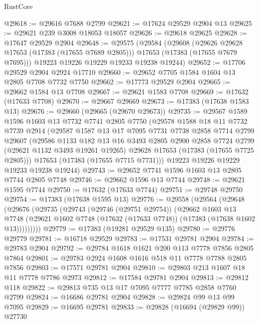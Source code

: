 \begin{lexlean}{RustCore}
\begin{coremodule}
@29618 := @29616 @7688 @2799
@29621 := @17624 @29529 @2904 @13
@29625 := @29621 @239 @3008 @18053 @18057
@29626 := @29618 @29625
@29628 := @17647 @29529 @2904
@29648 := @29575
    (@29584
      (@29608
        (@29626 @29628 @17653 (@17383 (@17655 @7689 @2805)))
        @17653
        (@17383 (@17655 @7679 @7695)))
      @19223
      @19226
      @19229
      @19233
      @19238
      @19244)
@29652 := @17706 @29529 @2904 @2924 @17710
@29660 := @29652 @7705 @1584 @1604 @13 @2805 @7708 @7732 @7750
@29662 := @17773 @29529 @2904
@29665 := @29662 @1584 @13 @7708
@29667 := @29621 @1583 @7708
@29669 := @17632 (@17633 @7708)
@29670 := @29667 @29669
@29673 := @17383 (@17638 @1583 @13)
@29676 := @29660 (@29665 (@29670 @29673))
@29735 := @29567
    @1589
    @1596
    @1603
    @13
    @7732
    @7741
    @2805
    @7750
    (@29578
      @1588
      @18
      @11
      @7732
      @7739
      @2914
      (@29587
        @1587
        @13
        @17
        @7095
        @7731
        @7738
        @2858
        @7714
        @2799
        @29607
        (@29586
          @1133
          @182
          @13
          @16
          @3493
          @2805
          @2900
          @2858
          @7724
          @2799
          (@29621 @1132 @3493 @19261 @19265)
          @29628
          @17653
          (@17383 (@17655 @7725 @2805)))
        @17653
        (@17383 (@17655 @7715 @7731)))
      @19223
      @19226
      @19229
      @19233
      @19238
      @19244)
@29743 := @29652 @7741 @1596 @1603 @13 @2805 @7744 @2805 @7748
@29746 := @29662 @1596 @13 @7744
@29748 := @29621 @1595 @7744
@29750 := @17632 (@17633 @7744)
@29751 := @29748 @29750
@29754 := @17383 (@17638 @1595 @13)
@29776 := @29558
    (@29564
      (@29648
        (@29676
          (@29735
            (@29743
              (@29746 (@29751 @29754))
              (@29662
                @1603
                @13
                @7748
                (@29621 @1602 @7748 (@17632 (@17633 @7748)) (@17383 (@17638 @1602 @13)))))))))
@29779 := @17383 (@19281 @29529 @135)
@29780 := @29776 @29779
@29781 := @16718 @29529
@29783 := @17531 @29781 @2904
@29784 := @29783 @2904
@29792 := @29784 @1618 @1621 @200 @113 @7778 @7856 @2805 @7864
@29801 := @29783 @2924 @1608 @1616 @518 @11 @7778 @7788 @2805 @7856
@29803 := @17571 @29781 @2904
@29810 := @29803 @213 @1607 @18 @11 @7778 @7786 @2973
@29812 := @17584 @29781 @2904
@29813 := @29812 @118
@29822 := @29813 @735 @13 @17 @7095 @7777 @7785 @2858 @7760 @2799
@29824 := @16686 @29781 @2904
@29828 := @29824 @99 @13 @99 @7095
@29829 := @16695 @29781
@29833 := @29828 (@16694 (@29829 @99)) @27730

\end{coremodule}
\end{lexlean}
